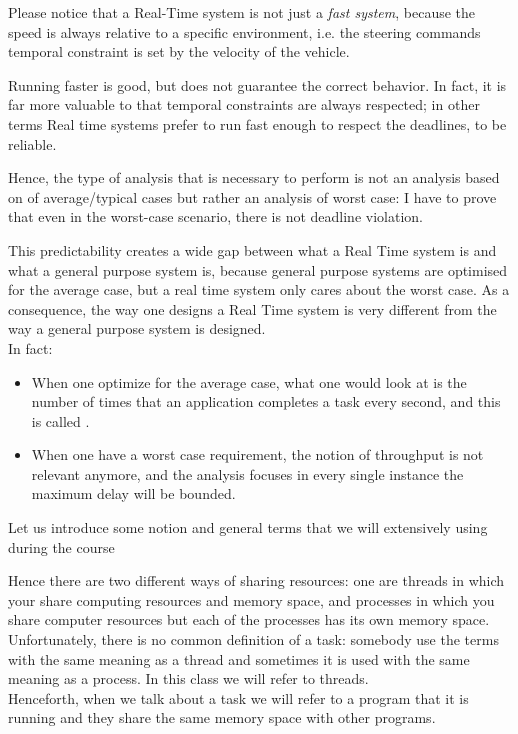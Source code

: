 Please notice that a Real-Time system is not just a \textit{fast system}, because the speed is always relative to a specific environment, i.e. the steering commands temporal constraint is set by the velocity of the vehicle.

Running faster is good, but does not guarantee the correct behavior. In fact, it is far more valuable to that temporal constraints are always respected; in other terms Real time systems prefer to run fast enough to respect the deadlines, to be reliable.

Hence, the type of analysis that is necessary to perform is not an analysis based on of average/typical cases but rather an analysis of worst case: I have to prove that even in the worst-case scenario, there is not deadline violation.

This predictability creates a wide gap between what a Real Time system is and what a general purpose system is, because general purpose systems are optimised for the average case, but a real time system only cares about the worst case. As a consequence, the way one designs a Real Time system is very different from the way a general purpose system is designed.\\
In fact:
\begin{itemize}
\item When one optimize for the average case, what one would look at is the number of times that an application completes a task every second, and this is called .
\item When one have a worst case requirement, the notion of throughput is not relevant anymore, and the analysis focuses in every single instance the maximum delay will be bounded.
\end{itemize}

Let us introduce some notion and general terms that we will extensively using during the course

Hence there are two different ways of sharing resources: one are threads in which your share computing resources and memory space, and processes in which you share computer resources but each of the processes has its own memory space.\\
Unfortunately, there is no common definition of a task: somebody use the terms with the same meaning as a thread and sometimes it is used with the same meaning as a process. In this class we will refer to threads.\\
Henceforth, when we talk about a task we will refer to a program that it is running and they share the same memory space with other programs.